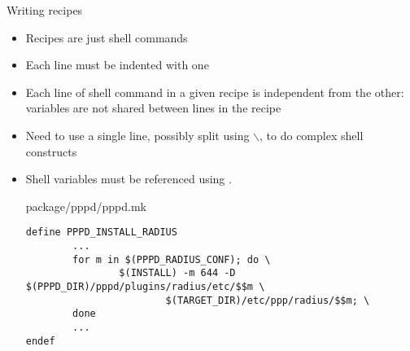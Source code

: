 \begin{frame}[fragile]{Writing recipes}

  \begin{itemize}
  \item Recipes are just shell commands
  \item Each line must be indented with one 
  \item Each line of shell command in a given recipe is independent
    from the other: variables are not shared between lines in the
    recipe
  \item Need to use a single line, possibly split using $\backslash$,
    to do complex shell constructs
  \item Shell variables must be referenced using .
    \begin{block}{package/pppd/pppd.mk}
\begin{verbatim}
define PPPD_INSTALL_RADIUS
        ...
        for m in $(PPPD_RADIUS_CONF); do \
                $(INSTALL) -m 644 -D $(PPPD_DIR)/pppd/plugins/radius/etc/$$m \
                        $(TARGET_DIR)/etc/ppp/radius/$$m; \
        done
        ...
endef
\end{verbatim}
\end{block}
  \end{itemize}
\end{frame}
